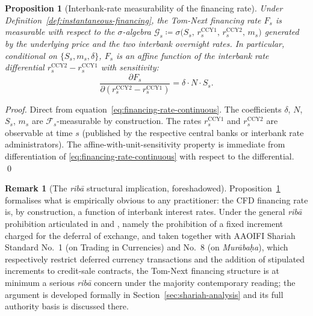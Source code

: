 \documentclass[preprint,12pt,authoryear]{elsarticle}
\newcommand{\FF}{\mathcal{F}}
\newtheorem{proposition}{Proposition}[section]
\theoremstyle{definition}
\newtheorem{remark}{Remark}[section]
\begin{document}
\begin{proposition}[Interbank-rate measurability of the
    financing rate]
\label{prop:financing-measurable}
Under Definition~\ref{def:instantaneous-financing}, the
Tom-Next financing rate $F_s$ is measurable with respect to
the $\sigma$-algebra
$\mathcal{G}_s \coloneqq \sigma\bigl( S_s,\,
r^{\text{CCY1}}_{s},\, r^{\text{CCY2}}_{s},\, m_s \bigr)$
generated by the underlying price and the two interbank
overnight rates. In particular, conditional on
$\{S_s, m_s, \delta\}$, $F_s$ is an affine function of the interbank
rate differential $r^{\text{CCY2}}_{s} - r^{\text{CCY1}}_{s}$
with sensitivity:
\begin{equation}
    \frac{\partial F_s}{\partial
      (r^{\text{CCY2}}_{s} - r^{\text{CCY1}}_{s})}
    = \delta \cdot N \cdot S_s.
    \label{eq:financing-measurable}
\end{equation}
\end{proposition}

\begin{proof}
Direct from equation~\eqref{eq:financing-rate-continuous}. The
coefficients $\delta$, $N$, $S_s$, $m_s$ are $\FF_s$-measurable by
construction. The rates $r^{\text{CCY1}}_{s}$ and $r^{\text{CCY2}}_{s}$
are observable at time $s$ (published by the respective central banks
or interbank rate administrators). The affine-with-unit-sensitivity
property is immediate from differentiation of
\eqref{eq:financing-rate-continuous} with respect to the differential.
\qed
\end{proof}

\begin{remark}[The \emph{rib\={a}} structural implication, foreshadowed]
\label{rem:riba-foreshadow}
Proposition~\ref{prop:financing-measurable} formalises what is
empirically obvious to any practitioner: the CFD financing rate is,
by construction, a function of interbank interest rates. Under the
general \emph{rib\={a}} prohibition articulated in \citet{Usmani2002}
and \citet{Kamali2000}, namely the prohibition of a fixed increment
charged for the deferral of exchange, and taken together with
AAOIFI Shariah Standard No.~1 (on Trading in Currencies) and No.~8
(on \emph{Mur\={a}ba\d{h}a}), which respectively restrict deferred
currency transactions and the addition of stipulated increments to
credit-sale contracts, the Tom-Next financing structure is at
minimum a serious \emph{rib\={a}} concern under the majority
contemporary reading; the argument is developed formally in
Section~\ref{sec:shariah-analysis} and its full authority basis is
discussed there.
\end{remark}
\end{document}
